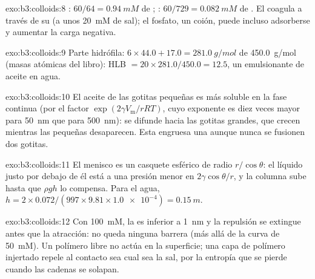 \begin{solution}{exo:b3:colloids:8}
: $60/64 = \qty{0.94}{mM}$ de ; : $60/729 = \qty{0.082}{mM}$ de . El 
coagula a través de su  (a unos \qty{20}{mM} de sal); el fosfato, un
coión, puede incluso adsorberse y aumentar la carga negativa.
\end{solution}

\begin{solution}{exo:b3:colloids:9}
Parte hidrófila: $6 \times 44.0 + 17.0 = \qty{281.0}{g/mol}$ de \qty{450.0}{g/mol} (masas atómicas del libro):
HLB $= 20 \times 281.0/450.0 = 12.5$, un emulsionante de aceite en agua.
\end{solution}

\begin{solution}{exo:b3:colloids:10}
El aceite de las gotitas pequeñas es más soluble en la fase continua (por el
factor $\exp(2\gamma V_{\mathrm m}/rRT)$, cuyo exponente es diez veces mayor para \qty{50}{nm} que para \qty{500}{nm}): se
difunde hacia las gotitas grandes, que crecen mientras las pequeñas desaparecen. Esta
 engruesa una  aunque nunca se fusionen dos gotitas.
\end{solution}

\begin{solution}{exo:b3:colloids:11}
El menisco es un casquete esférico de radio $r/\cos\theta$: el líquido justo por debajo de él está a una
presión menor en $2\gamma\cos\theta/r$, y la columna sube hasta que $\rho gh$ lo compensa. Para el agua,
$h = 2 \times 0.072/(997 \times 9.81 \times \num{1.0e-4}) = \qty{0.15}{m}$.
\end{solution}

\begin{solution}{exo:b3:colloids:12}
Con \qty{100}{mM}, la  es inferior a \qty{1}{nm} y la repulsión se extingue antes que la
atracción: no queda ninguna barrera (más allá de la curva de \qty{50}{mM}). Un polímero libre no
actúa en la superficie; una capa de polímero injertado repele al contacto sea cual sea la
sal, por la entropía que se pierde cuando las cadenas se solapan.
\end{solution}

